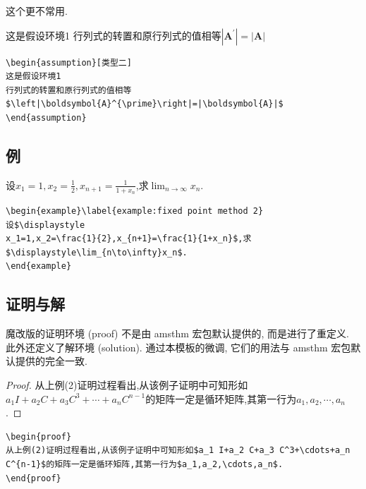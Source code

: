 \documentclass[../book.tex]{subfiles}
\begin{document}
这个更不常用.

\begin{assumption}[类型二]
这是假设环境1
行列式的转置和原行列式的值相等$\left|\boldsymbol{A}^{\prime}\right|=|\boldsymbol{A}|$
\end{assumption}

\begin{lstlisting}
\begin{assumption}[类型二]
这是假设环境1
行列式的转置和原行列式的值相等$\left|\boldsymbol{A}^{\prime}\right|=|\boldsymbol{A}|$
\end{assumption}
\end{lstlisting}

    \subsection{例}

\begin{example}\label{example:fixed point method 2}
设$\displaystyle
x_1=1,x_2=\frac{1}{2},x_{n+1}=\frac{1}{1+x_n}$,求$\displaystyle\lim_{n\to\infty}x_n$.
\end{example}

\begin{lstlisting}
\begin{example}\label{example:fixed point method 2}
设$\displaystyle
x_1=1,x_2=\frac{1}{2},x_{n+1}=\frac{1}{1+x_n}$,求$\displaystyle\lim_{n\to\infty}x_n$.
\end{example}
\end{lstlisting}

    \subsection{证明与解}
魔改版的证明环境 (proof) 不是由 amsthm 宏包默认提供的, 而是进行了重定义. 此外还定义了解环境 (solution). 通过本模板的微调, 它们的用法与 amsthm 宏包默认提供的完全一致.

\begin{proof}
从上例(2)证明过程看出,从该例子证明中可知形如$a_1 I+a_2 C+a_3 C^3+\cdots+a_n
C^{n-1}$的矩阵一定是循环矩阵,其第一行为$a_1,a_2,\cdots,a_n$.
\end{proof}

\begin{lstlisting}
\begin{proof}
从上例(2)证明过程看出,从该例子证明中可知形如$a_1 I+a_2 C+a_3 C^3+\cdots+a_n
C^{n-1}$的矩阵一定是循环矩阵,其第一行为$a_1,a_2,\cdots,a_n$.
\end{proof}
\end{lstlisting}
\end{document}
